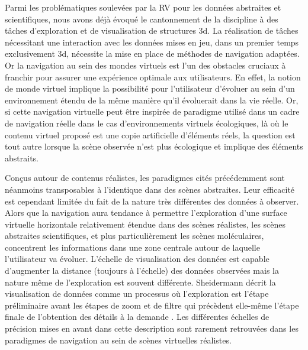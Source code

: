 Parmi les problématiques soulevées par la RV pour les données abstraites et scientifiques, nous avons déjà évoqué le cantonnement de la discipline à des tâches d'exploration et de visualisation de structures 3d. La réalisation de tâches nécessitant une interaction avec les données mises en jeu, dans un premier temps exclusivement 3d, nécessite la mise en place de méthodes de navigation adaptées. Or la navigation au sein des mondes virtuels est l'un des obstacles cruciaux à franchir pour assurer une expérience optimale aux utilisateurs. En effet, la notion de monde virtuel implique la possibilité pour l'utilisateur d'évoluer au sein d'un environnement étendu de la même manière qu'il évoluerait dans la vie réelle. Or, si cette navigation virtuelle peut être inspirée de paradigme utilisé dans un cadre de navigation réelle dans le cas d'environnements virtuels écologiques, là où le contenu virtuel proposé est une copie artificielle d'éléments réels, la question est tout autre lorsque la scène observée n'est plus écologique et implique des éléments abstraits. 


Conçus autour de contenus réalistes, les paradigmes cités précédemment sont néanmoins transposables à l'identique dans des scènes abstraites. Leur efficacité est cependant limitée du fait de la nature très différentes des données à observer. Alors que la navigation aura tendance à permettre l'exploration d'une surface virtuelle horizontale relativement étendue dans des scènes réalistes, les scènes abstraites scientifiques, et plus particulièrement les scènes moléculaires, concentrent les informations dans une zone centrale autour de laquelle l'utilisateur va évoluer. L'échelle de visualisation des données est capable d'augmenter la distance (toujours à l'échelle) des données observées mais la nature même de l'exploration est souvent différente. Sheidermann décrit la visualisation de données comme un processus où l'exploration est l'étape préliminaire avant les étapes de zoom et de filtre qui précèdent elle-même l'étape finale de l'obtention des détails à la demande \cite{shneiderman_eyes_1996}. Les différentes échelles de précision mises en avant dans cette description sont rarement retrouvées dans les paradigmes de navigation au sein de scènes virtuelles réalistes.

